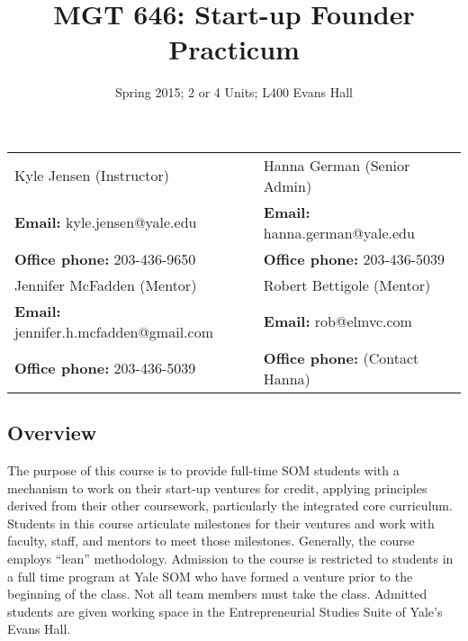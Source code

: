 
\usepackage{hyperref}
\title{MGT 646: Start-up Founder Practicum}
\author{Spring 2015; 2 or 4 Units; L400 Evans Hall}
\date{}


\maketitle

\begin{center}
\begin{tabularx}{\textwidth}{LL}\toprule
Kyle Jensen (Instructor) & Hanna German (Senior Admin) \\

\textbf{Email:} kyle.jensen@yale.edu &
\textbf{Email:} hanna.german@yale.edu\\

\textbf{Office phone:} 203-436-9650 &
\textbf{Office phone:} 203-436-5039\\ \midrule

Jennifer McFadden (Mentor) &
Robert Bettigole (Mentor) \\

\textbf{Email:} jennifer.h.mcfadden@gmail.com &
\textbf{Email:} rob@elmvc.com\\

\textbf{Office phone:} 203-436-5039 &
\textbf{Office phone:} (Contact Hanna) 
\\

\bottomrule

\end{tabularx}
\end{center}

\subsection*{Overview}
The purpose of this course is to provide full-time SOM students with a mechanism to work on their start-up ventures for credit, applying principles derived from their other coursework, particularly the integrated core curriculum. Students in this course articulate milestones for their ventures and work with faculty, staff, and mentors to meet those milestones. Generally, the course employs ``lean'' methodology. Admission to the course is restricted to students in a full time program at Yale SOM who have formed a venture prior to the beginning of the class. Not all team members must take the class. Admitted students are given working space in the Entrepreneurial Studies Suite of Yale's Evans Hall.

